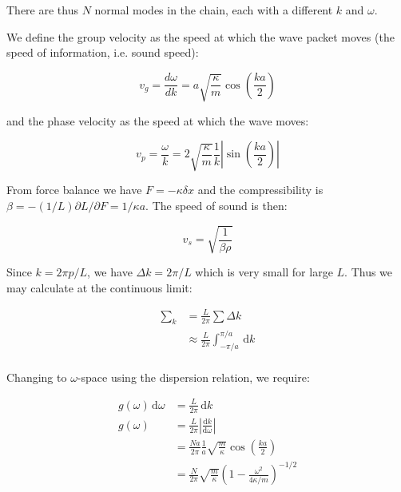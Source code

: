 \documentclass[12pt]{article}
\begin{document}
There are thus $N$ normal modes in the chain, each with a different $k$ and $\omega$.

We define the group velocity as the speed at which the wave packet moves (the speed of information, i.e. sound speed):

\begin{equation}
    v_{g} = \frac{d\omega}{dk} = a \sqrt{\frac{\kappa}{m}} \cos{\left( \frac{ka}{2} \right)}
\end{equation}

and the phase velocity as the speed at which the wave moves:

\begin{equation}
    v_{p} = \frac{\omega}{k} = 2\sqrt{\frac{\kappa}{m}} \frac{1}{k} \left\lvert \sin{\left( \frac{ka}{2} \right)} \right\rvert
\end{equation}

From force balance we have $F = -\kappa \delta x$ and the compressibility is $\beta = -(1/L) \partial L/\partial F = 1/\kappa a$. The speed of sound is then:

\begin{equation}
    v_{s} = \sqrt{\frac{1}{\beta \rho}}
\end{equation}

Since $k = 2\pi p / L$, we have $\Delta k = 2\pi / L$ which is very small for large $L$. Thus we may calculate at the continuous limit:

\begin{equation}
    \begin{split}
        \sum_{k} &= \frac{L}{2\pi} \sum \Delta k \\
        &\approx \frac{L}{2\pi} \int_{-\pi/a}^{\pi/a} \, \mathrm{d}k \\
    \end{split}
\end{equation}

Changing to $\omega$-space using the dispersion relation, we require:

\begin{equation}
    \begin{split}
        g(\omega) \, \mathrm{d}\omega &= \frac{L}{2\pi} \, \mathrm{d}k \\
        g(\omega) &= \frac{L}{2\pi} \left\lvert \frac{\mathrm{d}k}{\mathrm{d}\omega} \right\rvert \\
        &= \frac{Na}{2\pi} \frac{1}{a} \sqrt{\frac{m}{\kappa}} \cos{\left( \frac{ka}{2} \right)} \\
        &= \frac{N}{2\pi} \sqrt{\frac{m}{\kappa}} \left( 1 - \frac{\omega^{2}}{4\kappa/m} \right)^{-1/2}
    \end{split}
\end{equation}
\end{document}
